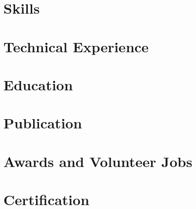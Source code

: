 \documentclass[letter,10pt]{article}
\begin{document}


\section{Skills}


\section{Technical Experience}


\section{Education}


\section{Publication}

\section{Awards and Volunteer Jobs}



\section{Certification}

\end{document}
